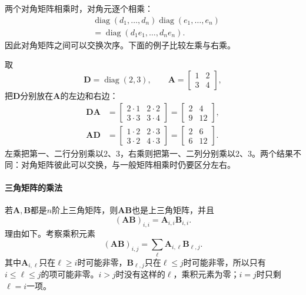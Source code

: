 两个对角矩阵相乘时，对角元逐个相乘：
\[
 \begin{aligned}
 &\operatorname{diag}(d_1,\ldots,d_n)\operatorname{diag}(e_1,\ldots,e_n)\\
 &=\operatorname{diag}(d_1e_1,\ldots,d_ne_n).
 \end{aligned}
\]
因此对角矩阵之间可以交换次序。下面的例子比较左乘与右乘。
\begin{example}[左乘与右乘对角矩阵]
\label{ex:ls-diagonal-scaling}
取
\[
\bm D=\operatorname{diag}(2,3),\qquad
\bm A=\begin{bmatrix}1&2\\3&4\end{bmatrix},
\]
把$\bm D$分别放在$\bm A$的左边和右边：
\[
 \begin{aligned}
 \bm D\bm A&=\begin{bmatrix}2\cdot1&2\cdot2\\3\cdot3&3\cdot4\end{bmatrix}=\begin{bmatrix}2&4\\9&12\end{bmatrix},\\
 \bm A\bm D&=\begin{bmatrix}1\cdot2&2\cdot3\\3\cdot2&4\cdot3\end{bmatrix}=\begin{bmatrix}2&6\\6&12\end{bmatrix}.
 \end{aligned}
\]
左乘把第一、二行分别乘以$2$、$3$，右乘则把第一、二列分别乘以$2$、$3$。两个结果不同：对角矩阵彼此可以交换，与一般矩阵相乘时仍要区分左右。
\end{example}

\paragraph{三角矩阵的乘法}
若$\bm A,\bm B$都是$n$阶上三角矩阵，则$\bm A\bm B$也是上三角矩阵，并且
\[
 (\bm A\bm B)_{i,i}=\bm A_{i,i}\bm B_{i,i}.
\]
理由如下。考察乘积元素
\[
 (\bm A\bm B)_{i,j}=\sum_\ell\bm A_{i,\ell}\bm B_{\ell,j}.
\]
其中$\bm A_{i,\ell}$只在$\ell\geq i$时可能非零，$\bm B_{\ell,j}$只在$\ell\leq j$时可能非零，所以只有$i\leq\ell\leq j$的项可能非零。$i>j$时没有这样的$\ell$，乘积元素为零；$i=j$时只剩$\ell=i$一项。

